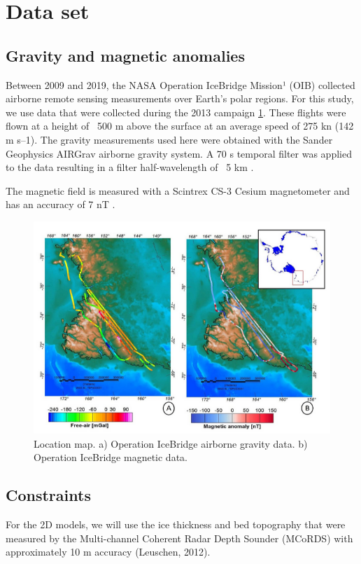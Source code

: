 \documentclass{article}
\begin{document}
\section{Data set}
\label{sec:dataset}
	\subsection{Gravity and magnetic anomalies}
	\label{ssec:dataset_gravmag}
	Between 2009 and 2019, the NASA Operation IceBridge Mission¹ (OIB) collected airborne remote 
	sensing measurements over Earth’s polar regions. For this study, we use data that were collected 
	during the 2013 campaign \ref{fig:flightdata}. These flights were flown at a height of ~500 m above the surface 
	at an average speed of 275 kn (142 m s–1). The gravity measurements used here were obtained with the 
	Sander Geophysics AIRGrav airborne gravity system. A 70 s temporal filter was applied to the data 
	resulting in a filter half-wavelength of ~5 km \citep{Cochran2012}. 
	
	The magnetic field is measured with a Scintrex CS-3 Cesium magnetometer and has an accuracy of 7 nT 
	\citep{Cochran2011}.

\begin{figure}[!htb] %
	\centering
	\includegraphics[width=0.5\columnwidth]{../figures/flightdata}
	\caption{
		Location map.
		a) Operation IceBridge airborne gravity data. 
		b) Operation IceBridge magnetic data.
	}
\label{fig:flightdata}
\end{figure} 

	\subsection{Constraints}
	\label{ssec:dataset_constraints}
	For the 2D models, we will use the ice thickness and bed topography that were 
	measured by the Multi-channel Coherent Radar Depth Sounder (MCoRDS) with 
	approximately 10 m accuracy (Leuschen, 2012).
	
\end{document}
